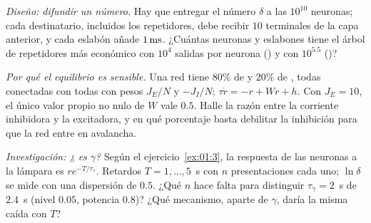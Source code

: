 \begin{exercise}[\lvlB]
\label{ex:01:5}
\emph{Diseño: difundir un número.} Hay que entregar el número $\delta$ a las $10^{10}$ neuronas; cada destinatario, incluidos los repetidores, debe recibir $10$ terminales de la capa anterior, y cada eslabón añade $1\,\text{ms}$. ¿Cuántas neuronas y eslabones tiene el árbol de repetidores más económico con $10^4$ salidas por neurona () y con $10^{5.5}$ ()?
\end{exercise}

\begin{exercise}[\lvlB]
\label{ex:01:6}
\emph{Por qué el equilibrio es sensible.} Una red tiene $80\%$ de  y $20\%$ de , todas conectadas con todas con pesos $J_E/N$ y $-J_I/N$; $\tau\dot r=-r+Wr+h$. Con $J_E=10$, el único valor propio no nulo de $W$ vale $0.5$. Halle la razón entre la corriente inhibidora y la excitadora, y en qué porcentaje basta debilitar la inhibición para que la red entre en avalancha.
\end{exercise}

\begin{exercise}[\lvlC]
\label{ex:01:7}
\emph{Investigación: ¿ es $\gamma$?} Según el ejercicio~\ref{ex:01:3}, la respuesta de las neuronas  a la lámpara es $re^{-T/\tau_\gamma}$. Retardos $T=1,\dots,5$~s con $n$ presentaciones cada uno; $\ln\delta$ se mide con una dispersión de $0.5$. ¿Qué $n$ hace falta para distinguir $\tau_\gamma=2$~s de $2.4$~s (nivel $0.05$, potencia $0.8$)? ¿Qué mecanismo, aparte de $\gamma$, daría la misma caída con $T$?
\end{exercise}
